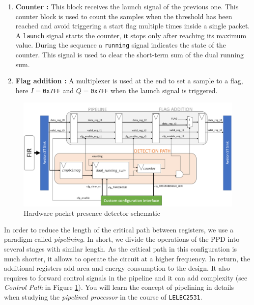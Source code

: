 \begin{enumerate}
    \item \textbf{Counter :} This block receives the launch signal of the previous one. This counter block is used to count the samples when the threshold has been reached and avoid triggering a start flag multiple times inside a single packet. A \texttt{launch} signal starts the counter, it stops only after reaching its maximum value. During the sequence a \texttt{running} signal indicates the state of the counter. This signal is used to clear the short-term sum of the dual running sum.

    \item \textbf{Flag addition :} A multiplexer is used at the end to set a sample to a flag, here $I=$\texttt{0x7FF} and $Q=$\texttt{0x7FF}  when the launch signal is triggered.

\end{enumerate}


\begin{figure}[h]
    \centering
    \includegraphics[width=\linewidth]{figures/packet_presence_detection.png}
    \caption{Hardware packet presence detector schematic}
    \label{fig:pd_schematic}
\end{figure}

In order to reduce the length of the critical path between registers, we use a paradigm called \textit{pipelining}. In short, we divide the operations of the PPD into several stages with similar length. As the critical path in this configuration is much shorter, it allows to operate the circuit at a higher frequency. In return, the additional registers add area and energy consumption to the design. It also requires to forward control signals in the pipeline and it can add complexity (see \textit{Control Path} in Figure \ref{fig:pd_schematic}). You will learn the concept of pipelining in details when studying the \textit{pipelined processor} in the course of \texttt{LELEC2531}.

